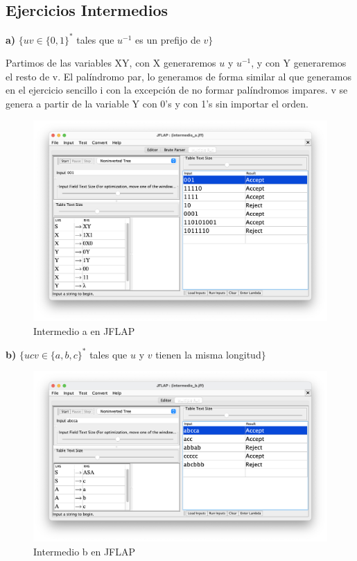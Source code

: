 \newpage

\subsection{Ejercicios Intermedios}

\textbf{a)}  $\{ uv \in \{0,1\}^{\ast} $ tales que $u^{-1}$ es un prefijo de $v\}$

Partimos de las variables XY, con X generaremos $u$ y $u^{-1}$, y con Y generaremos el resto de v. El palíndromo par, lo generamos de forma
similar al que generamos en el ejercicio sencillo i con la excepción de no formar palíndromos impares.
v se genera a partir de la variable Y con 0's y con 1's sin importar el orden.

\begin{figure}[H] 
	\centering
	\includegraphics[scale=0.325]{../practica_1/images/intermedio_a.png} 
	\caption{Intermedio a en JFLAP} 
    \label{fig:intermedio_a}
\end{figure}

\textbf{b)}  $\{ ucv \in \{a,b,c\}^{\ast} $ tales que $u$ y $v$ tienen la misma longitud$\}$

\begin{figure}[H] 
	\centering
	\includegraphics[scale=0.35]{../practica_1/images/intermedio_b.png} 
	\caption{Intermedio b en JFLAP} 
    \label{fig:intermedio_b}
\end{figure}


